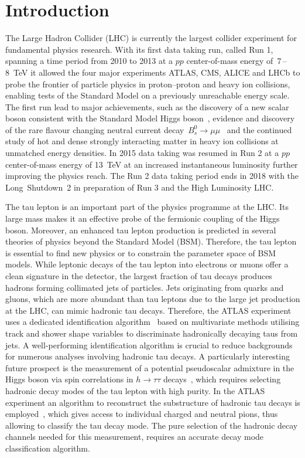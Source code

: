 \chapter*{Introduction}
\label{sec:intro}

The Large Hadron Collider (LHC) is currently the largest collider experiment for
fundamental physics research. With its first data taking run, called Run 1,
spanning a time period from 2010 to 2013 at a $pp$ center-of-mass energy
of~\num{7}\,--\,\SI{8}{\TeV} it allowed the four major experiments ATLAS, CMS,
ALICE and LHCb to probe the frontier of particle physics in proton--proton and
heavy ion collisions, enabling tests of the Standard Model on a previously
unreachable energy scale. The first run lead to major achievements, such as the
discovery of a new scalar boson consistent with the Standard Model Higgs
boson~\cite{higgs_atlas, higgs_cms}, evidence and discovery of the rare flavour
changing neutral current decay~$B_s^0 \to \mu \mu$~\cite{lhcb_bs_mumu,
  cms_bs_mumu} and the continued study of hot and dense strongly interacting
matter in heavy ion collisions at unmatched energy densities. In 2015 data
taking was resumed in Run 2 at a $pp$ center-of-mass energy of \SI{13}{\TeV} at
an increased instantaneous luminosity further improving the physics reach. The
Run 2 data taking period ends in 2018 with the Long~Shutdown~2 in preparation of
Run 3 and the High Luminosity LHC.

The tau lepton is an important part of the physics programme at the LHC. Its
large mass makes it an effective probe of the fermionic coupling of the Higgs
boson. Moreover, an enhanced tau lepton production is predicted in several
theories of physics beyond the Standard Model (BSM). Therefore, the tau lepton
is essential to find new physics or to constrain the parameter space of BSM
models. While leptonic decays of the tau lepton into electrons or muons offer a
clean signature in the detector, the largest fraction of tau decays produces
hadrons forming collimated jets of particles. Jets originating from quarks and
gluons, which are more abundant than tau leptons due to the large jet production
at the LHC, can mimic hadronic tau decays. Therefore, the ATLAS experiment uses
a dedicated identification algorithm~\cite{atlas:taurec:run1, atlas:taurec:run2}
based on multivariate methods utilising track and shower shape variables to
discriminate hadronically decaying taus from jets. A well-performing
identification algorithm is crucial to reduce backgrounds for numerous analyses
involving hadronic tau decays. A particularly interesting future prospect is the
measurement of a potential pseudoscalar admixture in the Higgs boson via spin
correlations in $h \to \tau\tau$ decays~\cite{desch_higgs_cp, harnik,
  Berge2014}, which requires selecting hadronic decay modes of the tau lepton
with high purity. In the ATLAS experiment an algorithm to reconstruct the
substructure of hadronic tau decays is employed~\cite{atlas:taurec:decaymodes},
which gives access to individual charged and neutral pions, thus allowing to
classify the tau decay mode. The pure selection of the hadronic decay channels
needed for this measurement, requires an accurate decay mode classification
algorithm.

